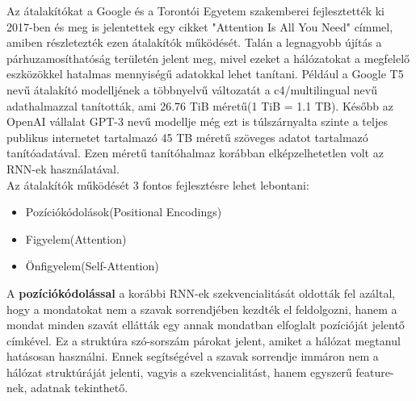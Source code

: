Az átalakítókat a Google és a Torontói Egyetem szakemberei fejlesztették ki 2017-ben és meg is jelentettek egy cikket "Attention Is All You Need"\cite{attention} címmel, amiben részletezték ezen átalakítók működését. Talán a legnagyobb újítás a párhuzamosíthatóság területén jelent meg, mivel ezeket a hálózatokat a megfelelő eszközökkel hatalmas mennyiségű adatokkal lehet tanítani. Például a Google T5 nevű átalakító modelljének a többnyelvű változatát a c4/multilingual nevű adathalmazzal tanították, ami 26.76 TiB méretű(1 TiB = 1.1 TB). Később az OpenAI vállalat GPT-3 nevű modellje még ezt is túlszárnyalta szinte a teljes publikus internetet tartalmazó 45 TB méretű szöveges adatot tartalmazó tanítóadatával. Ezen méretű tanítóhalmaz korábban elképzelhetetlen volt az RNN-ek használatával.\\
Az átalakítók működését 3 fontos fejlesztésre lehet lebontani:

\begin{itemize}
\item Pozíciókódolások(Positional Encodings)
\item Figyelem(Attention)
\item Önfigyelem(Self-Attention)
\end{itemize}

A \textbf{pozíciókódolással} a korábbi RNN-ek szekvencialitását oldották fel azáltal, hogy a mondatokat nem a szavak sorrendjében kezdték el feldolgozni, hanem a mondat minden szavát ellátták egy annak mondatban elfoglalt pozícióját jelentő címkével. Ez a struktúra szó-sorszám párokat jelent, amiket a hálózat megtanul hatásosan használni. Ennek segítségével a szavak sorrendje immáron nem a hálózat struktúráját jelenti, vagyis a szekvencialitást, hanem egyszerű feature-nek, adatnak tekinthető.

